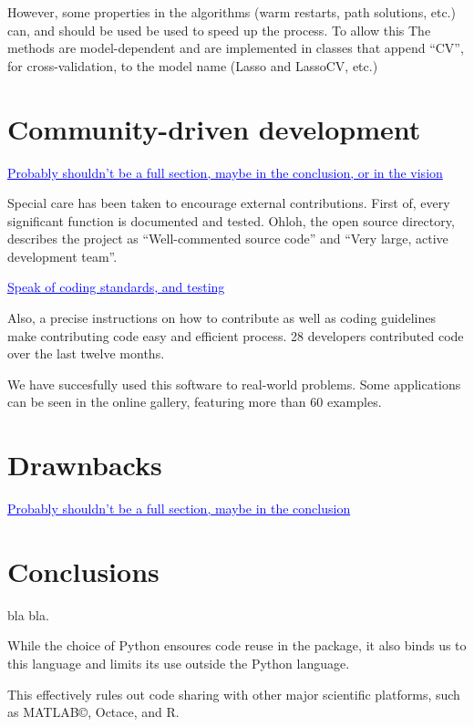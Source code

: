 \documentclass[twoside,11pt]{article}
\newcommand{\GAEL}[1]{\textcolor{blue}{\uline{#1}}}
\begin{document}
However, some properties in the algorithms (warm restarts, path
solutions, etc.) can, and should be used be used to speed up the
process. To allow this The methods are model-dependent and are
implemented in classes that append ``CV'', for cross-validation, to
the model name (Lasso and LassoCV, etc.)


\section{Community-driven development}

\GAEL{Probably shouldn't be a full section, maybe in the conclusion, or
in the vision}

Special care has been taken to encourage external contributions. First
of, every significant function is documented and tested.  Ohloh, the
open source directory, describes the project as ``Well-commented
source code'' and ``Very large, active development team''.

\GAEL{Speak of coding standards, and testing} 

Also, a precise instructions on how to contribute as well as coding
guidelines make contributing code easy and efficient process. 28
developers contributed code over the last twelve months.

We have succesfully used this software to real-world problems. Some
applications can be seen in the online gallery, featuring more than 60
examples.


\section{Drawnbacks}

\GAEL{Probably shouldn't be a full section, maybe in the conclusion}



\section{Conclusions}

bla bla.

While the choice of Python ensoures code reuse in the package, it also
binds us to this language and limits its use outside the Python
language.

This effectively rules out code sharing with other major scientific
platforms, such as MATLAB©, Octace, and R.
\end{document}
